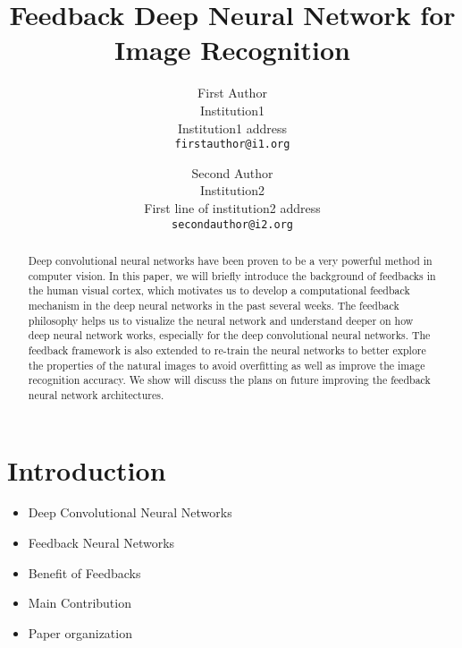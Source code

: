 \documentclass[10pt,twocolumn,letterpaper]{article}
\begin{document}
\title{Feedback Deep Neural Network for Image Recognition}

\author{First Author\\
Institution1\\
Institution1 address\\
{\tt\small firstauthor@i1.org}
\and
Second Author\\
Institution2\\
First line of institution2 address\\
{\tt\small secondauthor@i2.org}
}

\maketitle

\begin{abstract}
Deep convolutional neural networks have been proven to be a very powerful method in computer vision. In this paper, we will briefly introduce the background of feedbacks in the human visual cortex, which motivates us to develop a computational feedback mechanism in the deep neural networks in the past several weeks. The feedback philosophy helps us to visualize the neural network and understand deeper on how deep neural network works, especially for the deep convolutional neural networks. The feedback framework is also extended to re-train the neural networks to better explore the properties of the natural images to avoid overfitting as well as improve the image recognition accuracy. We show will discuss the plans on future improving the feedback neural network architectures.
\end{abstract}

\section{Introduction}
\begin{itemize}
  \item Deep Convolutional Neural Networks
  \item Feedback Neural Networks
  \item Benefit of Feedbacks
  \item Main Contribution
  \item Paper organization
\end{itemize}
\end{document}
